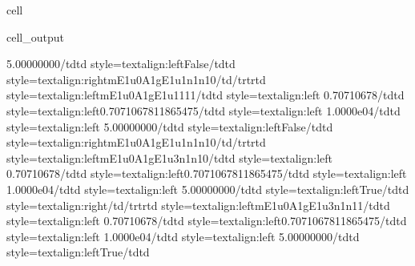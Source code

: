 \documentclass[letterpaper,table,10pt,english]{jupyterBook}
\begin{document}
\begin{sphinxuseclass}{cell}
\begin{sphinxVerbatimOutput}
\begin{sphinxuseclass}{cell_output}
\begin{sphinxVerbatim}[commandchars=\\\{\}]
5.00000000\PYGZlt{}/td\PYGZgt{}\PYGZlt{}td style=\PYGZbs{}\PYGZsq{}text\PYGZhy{}align:left\PYGZbs{}\PYGZsq{}\PYGZgt{}False\PYGZlt{}/td\PYGZgt{}\PYGZlt{}td style=\PYGZbs{}\PYGZsq{}text\PYGZhy{}align:right\PYGZbs{}\PYGZsq{}\PYGZgt{}m\PYGZus{}E1u\PYGZus{}0\PYGZus{}A1g\PYGZus{}E1u\PYGZus{}1\PYGZus{}n1\PYGZus{}n1\PYGZus{}0\PYGZlt{}/td\PYGZgt{}\PYGZlt{}/tr\PYGZgt{}\PYGZlt{}tr\PYGZgt{}\PYGZlt{}td style=\PYGZbs{}\PYGZsq{}text\PYGZhy{}align:left\PYGZbs{}\PYGZsq{}\PYGZgt{}m\PYGZus{}E1u\PYGZus{}0\PYGZus{}A1g\PYGZus{}E1u\PYGZus{}1\PYGZus{}1\PYGZus{}1\PYGZus{}1\PYGZlt{}/td\PYGZgt{}\PYGZlt{}td style=\PYGZbs{}\PYGZsq{}text\PYGZhy{}align:left\PYGZbs{}\PYGZsq{}\PYGZgt{} 0.70710678\PYGZlt{}/td\PYGZgt{}\PYGZlt{}td style=\PYGZbs{}\PYGZsq{}text\PYGZhy{}align:left\PYGZbs{}\PYGZsq{}\PYGZgt{}0.7071067811865475\PYGZlt{}/td\PYGZgt{}\PYGZlt{}td style=\PYGZbs{}\PYGZsq{}text\PYGZhy{}align:left\PYGZbs{}\PYGZsq{}\PYGZgt{} 1.0000e\PYGZhy{}04\PYGZlt{}/td\PYGZgt{}\PYGZlt{}td style=\PYGZbs{}\PYGZsq{}text\PYGZhy{}align:left\PYGZbs{}\PYGZsq{}\PYGZgt{} 5.00000000\PYGZlt{}/td\PYGZgt{}\PYGZlt{}td style=\PYGZbs{}\PYGZsq{}text\PYGZhy{}align:left\PYGZbs{}\PYGZsq{}\PYGZgt{}False\PYGZlt{}/td\PYGZgt{}\PYGZlt{}td style=\PYGZbs{}\PYGZsq{}text\PYGZhy{}align:right\PYGZbs{}\PYGZsq{}\PYGZgt{}m\PYGZus{}E1u\PYGZus{}0\PYGZus{}A1g\PYGZus{}E1u\PYGZus{}1\PYGZus{}n1\PYGZus{}n1\PYGZus{}0\PYGZlt{}/td\PYGZgt{}\PYGZlt{}/tr\PYGZgt{}\PYGZlt{}tr\PYGZgt{}\PYGZlt{}td style=\PYGZbs{}\PYGZsq{}text\PYGZhy{}align:left\PYGZbs{}\PYGZsq{}\PYGZgt{}m\PYGZus{}E1u\PYGZus{}0\PYGZus{}A1g\PYGZus{}E1u\PYGZus{}3\PYGZus{}n1\PYGZus{}n1\PYGZus{}0\PYGZlt{}/td\PYGZgt{}\PYGZlt{}td style=\PYGZbs{}\PYGZsq{}text\PYGZhy{}align:left\PYGZbs{}\PYGZsq{}\PYGZgt{} 0.70710678\PYGZlt{}/td\PYGZgt{}\PYGZlt{}td style=\PYGZbs{}\PYGZsq{}text\PYGZhy{}align:left\PYGZbs{}\PYGZsq{}\PYGZgt{}0.7071067811865475\PYGZlt{}/td\PYGZgt{}\PYGZlt{}td style=\PYGZbs{}\PYGZsq{}text\PYGZhy{}align:left\PYGZbs{}\PYGZsq{}\PYGZgt{} 1.0000e\PYGZhy{}04\PYGZlt{}/td\PYGZgt{}\PYGZlt{}td style=\PYGZbs{}\PYGZsq{}text\PYGZhy{}align:left\PYGZbs{}\PYGZsq{}\PYGZgt{} 5.00000000\PYGZlt{}/td\PYGZgt{}\PYGZlt{}td style=\PYGZbs{}\PYGZsq{}text\PYGZhy{}align:left\PYGZbs{}\PYGZsq{}\PYGZgt{}True\PYGZlt{}/td\PYGZgt{}\PYGZlt{}td style=\PYGZbs{}\PYGZsq{}text\PYGZhy{}align:right\PYGZbs{}\PYGZsq{}\PYGZgt{}\PYGZlt{}/td\PYGZgt{}\PYGZlt{}/tr\PYGZgt{}\PYGZlt{}tr\PYGZgt{}\PYGZlt{}td style=\PYGZbs{}\PYGZsq{}text\PYGZhy{}align:left\PYGZbs{}\PYGZsq{}\PYGZgt{}m\PYGZus{}E1u\PYGZus{}0\PYGZus{}A1g\PYGZus{}E1u\PYGZus{}3\PYGZus{}n1\PYGZus{}n1\PYGZus{}1\PYGZlt{}/td\PYGZgt{}\PYGZlt{}td style=\PYGZbs{}\PYGZsq{}text\PYGZhy{}align:left\PYGZbs{}\PYGZsq{}\PYGZgt{} 0.70710678\PYGZlt{}/td\PYGZgt{}\PYGZlt{}td style=\PYGZbs{}\PYGZsq{}text\PYGZhy{}align:left\PYGZbs{}\PYGZsq{}\PYGZgt{}0.7071067811865475\PYGZlt{}/td\PYGZgt{}\PYGZlt{}td style=\PYGZbs{}\PYGZsq{}text\PYGZhy{}align:left\PYGZbs{}\PYGZsq{}\PYGZgt{} 1.0000e\PYGZhy{}04\PYGZlt{}/td\PYGZgt{}\PYGZlt{}td style=\PYGZbs{}\PYGZsq{}text\PYGZhy{}align:left\PYGZbs{}\PYGZsq{}\PYGZgt{} 5.00000000\PYGZlt{}/td\PYGZgt{}\PYGZlt{}td style=\PYGZbs{}\PYGZsq{}text\PYGZhy{}align:left\PYGZbs{}\PYGZsq{}\PYGZgt{}True\PYGZlt{}/td\PYGZgt{}\PYGZlt{}td 
\end{sphinxVerbatim}
\end{sphinxuseclass}
\end{sphinxVerbatimOutput}
\end{sphinxuseclass}
\end{document}
